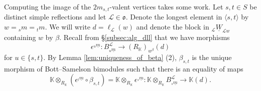 \documentclass{amsart}
\newcommand{\K}{\mathbb{K}}
\newcommand{\scrL}{\mathcal{L}}
\newcommand{\fr}[1]{\mathfrak{#1}}
\newcommand{\uW}[2]{{}_{#1}\underline{W}_{#2}}
\theoremstyle{definition}
\numberwithin{equation}{subsection}
\begin{document}
Computing the image of the $2m_{s,t}$-valent vertices takes some work. Let $s,t \in S$ be distinct simple reflections and let $\scrL \in \fr{o}$. Denote the longest element in $\langle s, t \rangle$ by $w = {}_s m = {}_t m$.
We will write $d = \ell_{\scrL} (w)$ and denote the block in $\uW{\scrL}{\scrL w}$ containing $w$ by $\beta$.
Recall from \S\ref{subsec:alg_dll} that we have morphisms
\[\epsilon^{{}_u \underline{m}} : B_{{}_u \underline{m}}^{\scrL} \to (R_{\K})_{w^{\beta}} (d)\]
for $u \in \{s,t\}$.
By Lemma \ref{lem:uniqueness_of_beta} (2), $\beta_{s,t}$ is the unique morphism of Bott--Samelson bimodules such that there is an equality of maps 
\begin{equation}
  \K \otimes_{R_{\K}} (\epsilon^{{}_t \underline{m}} \circ \beta_{s,t}) = \K \otimes_{R_{\K}} \epsilon^{{}_s \underline{m}} : \K \otimes_{R_{\K}} B_{{}_s \underline{m}}^{\scrL} \to \K (d).
\end{equation}
\end{document}
